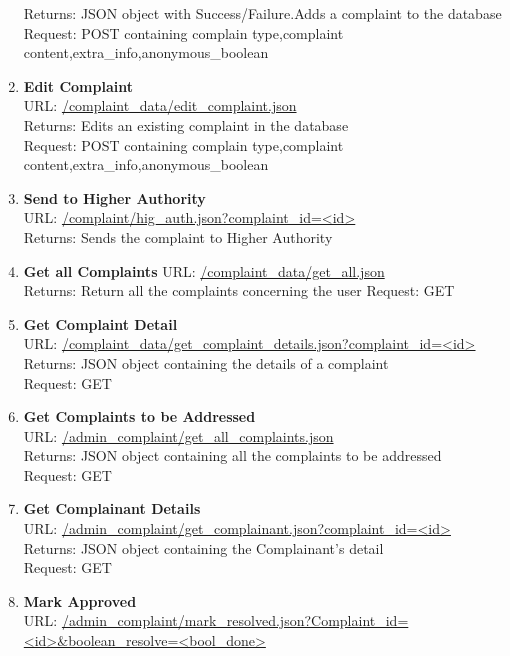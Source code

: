 \documentclass{article}
\begin{document}
\begin{enumerate}
						Returns: JSON object with Success/Failure.Adds a complaint to the database \\
						Request: POST containing complain type,complaint content,extra\_info,anonymous\_boolean 
					\item \textbf{Edit Complaint} \\
						URL: \url{/complaint_data/edit_complaint.json}\\
						Returns: Edits an existing complaint in the database\\
						Request: POST containing complain type,complaint content,extra\_info,anonymous\_boolean 
					\item \textbf{Send to Higher Authority} \\
						URL: \url{/complaint/hig_auth.json?complaint_id=<id>}\\
						Returns: Sends the complaint to Higher Authority
					\item \textbf{Get all Complaints}
						URL: \url{/complaint_data/get_all.json}\\
						Returns: Return all the complaints 
						concerning the user
						Request: GET
					\item \textbf{Get Complaint Detail}	\\					
						URL: \url{/complaint_data/get_complaint_details.json?complaint_id=<id>}\\
						Returns: JSON object containing the details of a complaint\\
						Request: GET 
					\item \textbf{Get Complaints to be Addressed} \\	
						URL: \url{/admin_complaint/get_all_complaints.json}\\
						Returns: JSON object containing all the complaints to be addressed\\
						Request: GET 
					\item \textbf{Get Complainant Details} \\
						URL: \url{/admin_complaint/get_complainant.json?complaint_id=<id>}\\
						Returns: JSON object containing the Complainant's detail\\
						Request: GET 
					\item \textbf{Mark Approved} \\
						URL: \url{/admin_complaint/mark_resolved.json?Complaint_id=<id>&boolean_resolve=<bool_done>}\\

\end{enumerate}
\end{document}

